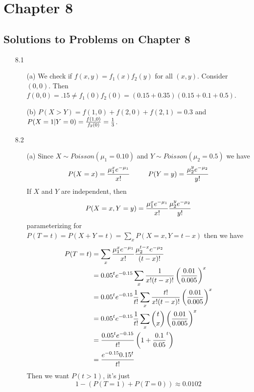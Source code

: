 \documentclass[english, 11pt]{article}
\begin{document}
  \section{Chapter 8}

  \subsection{Solutions to Problems on Chapter 8}

  \begin{itemize}
    \item[8.1]
    \begin{itemize}
      \item[(a)] We check if $f(x,y) = f_1(x)f_2(y)$ for all $(x,y)$. Consider $(0,0)$. Then $f(0,0) = .15 \not = f_1(0)f_2(0) = (0.15 + 0.35)(0.15 + 0.1 + 0.5)$.
      \item[(b)] $P(X > Y) = f(1, 0) + f(2, 0) + f(2,1) = 0.3$ and $P(X = 1 | Y = 0) = \frac{f(1,0)}{f_2(0)} = \frac{1}{3}$.
    \end{itemize}

    \item[8.2]
    \begin{itemize}
      \item[(a)] Since $X \sim Poisson(\mu_1 = 0.10)$ and $Y \sim Poisson (\mu_2 =0.5)$ we have
      \[ P(X = x) = \frac{\mu_1^xe^{-\mu_1}}{x!} \ \ \ \ \ \ \ \ P(Y = y) = \frac{\mu_2^ye^{-\mu_2}}{y!} \]
      If $X$ and $Y$ are independent, then
      \[ P(X = x, Y = y) =  \frac{\mu_1^xe^{-\mu_1}}{x!}\frac{\mu_2^ye^{-\mu_2}}{y!}\]
      parameterizing for $P(T = t) = P(X + Y = t) = \sum_xP(X = x, Y = t - x)$ then we have
      \begin{align*}
        P(T = t) & = \sum_x\frac{\mu_1^xe^{-\mu_1}}{x!}\frac{\mu_2^{t-x}e^{-\mu_2}}{(t-x)!} \\
        & = 0.05^te^{-0.15} \sum_x \frac{1}{x!(t-x)!}\left( \frac{0.01}{0.005} \right)^x \\
        & = 0.05^te^{-0.15} \frac{1}{t!} \sum_x \frac{t!}{x!(t-x)!}\left( \frac{0.01}{0.005} \right)^x \\
        & = 0.05^te^{-0.15} \frac{1}{t!} \sum_x {t \choose x} \left( \frac{0.01}{0.005} \right)^x \\
        & = \frac{0.05^te^{-0.15}}{t!} \left( 1 + \frac{0.1}{0.05}^t \right) \\
        & = \frac{e^{-0.15}0.15^t}{t!}
      \end{align*}
      Then we want $P(t > 1)$, it's just
      \[ 1 - (P(T = 1) + P(T = 0)) \approx 0.0102 \]


\end{itemize}
\end{itemize}
\end{document}
